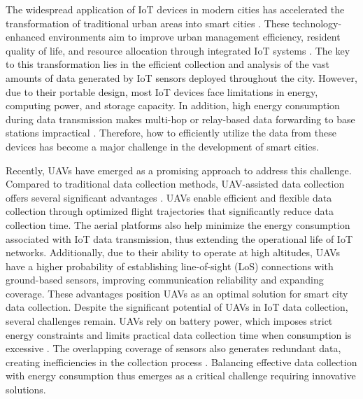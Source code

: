 \documentclass[sigconf]{acmart}
\begin{document}
The widespread application of IoT devices in modern cities has accelerated the transformation of traditional urban areas into smart cities \cite{1-smartCity_Transformation}. These technology-enhanced environments aim to improve urban management efficiency, resident quality of life, and resource allocation through integrated IoT systems \cite{2-smartCity_Resource_Allocation}.
The key to this transformation lies in the efficient collection and analysis of the vast amounts of data generated by IoT sensors deployed throughout the city. However, due to their portable design, most IoT devices face limitations in energy, computing power, and storage capacity. In addition, high energy consumption during data transmission makes multi-hop or relay-based data forwarding to base stations impractical \cite{3-multi-hop}. Therefore, how to efficiently utilize the data from these devices has become a major challenge in the development of smart cities.

 


Recently, UAVs have emerged as a promising approach to address this challenge. Compared to traditional data collection methods, UAV-assisted data collection offers several significant advantages \cite{4-uavAdvantages1,5-uavAdvantages2,6-uavAdvantages3,Seth2024}. UAVs enable efficient and flexible data collection through optimized flight trajectories that significantly reduce data collection time. The aerial platforms also help minimize the energy consumption associated with IoT data transmission, thus extending the operational life of IoT networks. Additionally, due to their ability to operate at high altitudes, UAVs have a higher probability of establishing line-of-sight (LoS) connections with ground-based sensors, improving communication reliability and expanding coverage. These advantages position UAVs as an optimal solution for smart city data collection.
Despite the significant potential of UAVs in IoT data collection, several challenges remain. UAVs rely on battery power, which imposes strict energy constraints and limits practical data collection time when consumption is excessive \cite{7-dataCollection_timeReduce,Sharma2023}. The overlapping coverage of sensors also generates redundant data, creating inefficiencies in the collection process \cite{8-Minimizing_redundant}. Balancing effective data collection with energy consumption thus emerges as a critical challenge requiring innovative solutions.
\end{document}
